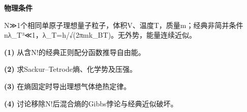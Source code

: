 \textbf{物理条件}\par N≫1个相同单原子理想量子粒子，体积V、温度T，质量m；经典非简并条件 nλ\_T³≪1，λ\_T=h/√(2πmk\_BT)。无外势，能量连续近似。
\par\noindent\textbf{(1)} 从含N!的经典正则配分函数推导自由能。
\par\noindent\textbf{(2)} 求Sackur–Tetrode熵、化学势及压强。
\par\noindent\textbf{(3)} 在熵固定时导出理想气体绝热定律。
\par\noindent\textbf{(4)} 讨论移除N!后混合熵的Gibbs悖论与经典近似破坏。

